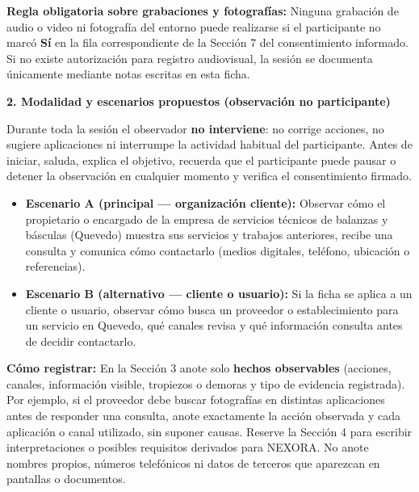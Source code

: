 \documentclass[11pt,a4paper]{article}
\begin{document}
\vspace{2pt}
{\small\textbf{Regla obligatoria sobre grabaciones y fotograf\'ias:} Ninguna grabaci\'on de audio o video ni fotograf\'ia del entorno puede realizarse si el participante no marc\'o \textbf{S\'i} en la fila correspondiente de la Secci\'on 7 del consentimiento informado. Si no existe autorizaci\'on para registro audiovisual, la sesi\'on se documenta \'unicamente mediante notas escritas en esta ficha.\par}

\vspace{3pt}
\textbf{2. Modalidad y escenarios propuestos (observaci\'on no participante)}

{\small
Durante toda la sesi\'on el observador \textbf{no interviene}: no corrige acciones, no sugiere aplicaciones ni interrumpe la actividad habitual del participante. Antes de iniciar, saluda, explica el objetivo, recuerda que el participante puede pausar o detener la observaci\'on en cualquier momento y verifica el consentimiento firmado.

\begin{itemize}[leftmargin=1.5em, itemsep=2pt, topsep=2pt]
    \item \textbf{Escenario A (principal --- organizaci\'on cliente):} Observar c\'omo el propietario o encargado de la empresa de servicios t\'ecnicos de balanzas y b\'asculas (Quevedo) muestra sus servicios y trabajos anteriores, recibe una consulta y comunica c\'omo contactarlo (medios digitales, tel\'efono, ubicaci\'on o referencias).
    \item \textbf{Escenario B (alternativo --- cliente o usuario):} Si la ficha se aplica a un cliente o usuario, observar c\'omo busca un proveedor o establecimiento para un servicio en Quevedo, qu\'e canales revisa y qu\'e informaci\'on consulta antes de decidir contactarlo.
\end{itemize}

\textbf{C\'omo registrar:} En la Secci\'on 3 anote solo \textbf{hechos observables} (acciones, canales, informaci\'on visible, tropiezos o demoras y tipo de evidencia registrada). Por ejemplo, si el proveedor debe buscar fotograf\'ias en distintas aplicaciones antes de responder una consulta, anote exactamente la acci\'on observada y cada aplicaci\'on o canal utilizado, sin suponer causas. Reserve la Secci\'on 4 para escribir interpretaciones o posibles requisitos derivados para NEXORA. No anote nombres propios, n\'umeros telef\'onicos ni datos de terceros que aparezcan en pantallas o documentos.
}
\end{document}
